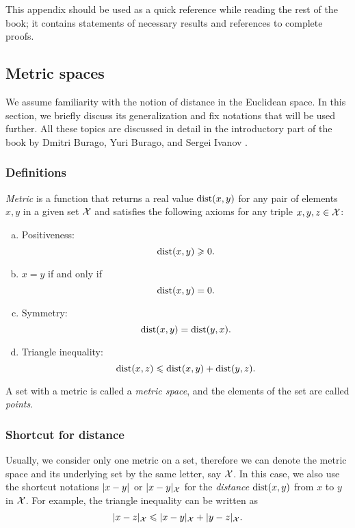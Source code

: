 \chapter[Appendix]{}
\chaptermark{}

\begin{multicols}{2}
{\footnotesize

This appendix should be used as a quick reference while reading the rest of the book;
it contains statements of necessary results and references to complete proofs.

\section{Metric spaces}\label{sec:metric-spcaes}

We assume familiarity with the notion of distance in the 
Euclidean space.
In this section, we briefly discuss its generalization and fix notations that will be used further.
All these topics are discussed in detail in the introductory part of the book by Dmitri Burago, Yuri Burago, and Sergei Ivanov \cite{burago-burago-ivanov}.

\subsection*{Definitions}

\emph{Metric} is a function that returns a real value $\mathop{\rm dist}\nolimits(x,y)$ for any pair of elements $x,y$ in a given set $\mathcal{X}$  and satisfies the following axioms for any triple $x,y,z\in \mathcal{X}$: \label{page:def:metric}
\begin{enumerate}[(a)]
\item\label{def:metric-space:a} Positiveness: 
$$\mathop{\rm dist}\nolimits(x,y)\geqslant 0.$$
\item\label{def:metric-space:b} $x=y$ if and only if 
$$\mathop{\rm dist}\nolimits(x,y)=0.$$
\item\label{def:metric-space:c} Symmetry: $$\mathop{\rm dist}\nolimits(x, y) = \mathop{\rm dist}\nolimits(y, x).$$
\item\label{def:metric-space:d} Triangle inequality: 
$$\mathop{\rm dist}\nolimits(x, z) \leqslant \mathop{\rm dist}\nolimits(x, y) + \mathop{\rm dist}\nolimits(y, z).$$
\end{enumerate}

A set with a metric is called a \emph{metric space}, and the elements of the set are called \emph{points}.

\subsection*{Shortcut for distance}
Usually, we consider only one metric on a set, therefore we can denote the metric space and its underlying set by the same letter, say $\mathcal{X}$.
In this case, we also use the shortcut notations $\dist{x}{y}{}$ or $\dist{x}{y}{\spc{X}}$ for the {}\emph{distance} $\mathop{\rm dist}\nolimits(x,y)$ from $x$ to $y$ in $\mathcal{X}$.
For example, the triangle inequality can be written as 
$$\dist{x}{z}{\spc{X}}\le \dist{x}{y}{\spc{X}}+\dist{y}{z}{\spc{X}}.$$

}
\end{multicols}
